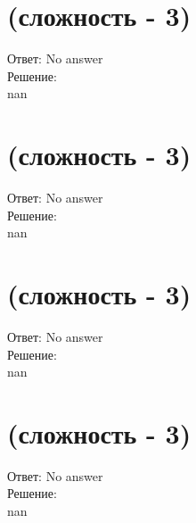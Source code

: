 \documentclass{article}%
\begin{document}
%
\section{(сложность {-} 3)}%
\label{sec:( {-} 3)}%
\hspace{3ex} Ответ: No answer \\%
%
\hspace*{3ex} Решение: \\%
nan

%
\section{(сложность {-} 3)}%
\label{sec:( {-} 3)}%
\hspace{3ex} Ответ: No answer \\%
%
\hspace*{3ex} Решение: \\%
nan

%
\section{(сложность {-} 3)}%
\label{sec:( {-} 3)}%
\hspace{3ex} Ответ: No answer \\%
%
\hspace*{3ex} Решение: \\%
nan

%
\section{(сложность {-} 3)}%
\label{sec:( {-} 3)}%
\hspace{3ex} Ответ: No answer \\%
%
\hspace*{3ex} Решение: \\%
nan

%
\end{document}
